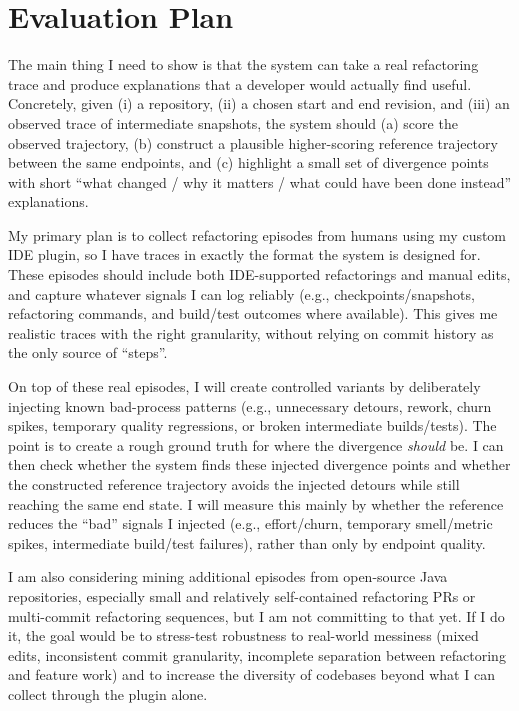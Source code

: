 \chapter{Evaluation Plan}
\label{ch:eval-plan}

The main thing I need to show is that the system can take a real refactoring trace and produce explanations that a developer would actually find useful. Concretely, given (i) a repository, (ii) a chosen start and end revision, and (iii) an observed trace of intermediate snapshots, the system should (a) score the observed trajectory, (b) construct a plausible higher-scoring reference trajectory between the same endpoints, and (c) highlight a small set of divergence points with short ``what changed / why it matters / what could have been done instead'' explanations.

My primary plan is to collect refactoring episodes from humans using my custom IDE plugin, so I have traces in exactly the format the system is designed for. These episodes should include both IDE-supported refactorings and manual edits, and capture whatever signals I can log reliably (e.g., checkpoints/snapshots, refactoring commands, and build/test outcomes where available). This gives me realistic traces with the right granularity, without relying on commit history as the only source of ``steps''.

On top of these real episodes, I will create controlled variants by deliberately injecting known bad-process patterns (e.g., unnecessary detours, rework, churn spikes, temporary quality regressions, or broken intermediate builds/tests). The point is to create a rough ground truth for where the divergence \emph{should} be. I can then check whether the system finds these injected divergence points and whether the constructed reference trajectory avoids the injected detours while still reaching the same end state. I will measure this mainly by whether the reference reduces the ``bad'' signals I injected (e.g., effort/churn, temporary smell/metric spikes, intermediate build/test failures), rather than only by endpoint quality.

I am also considering mining additional episodes from open-source Java repositories, especially small and relatively self-contained refactoring PRs or multi-commit refactoring sequences, but I am not committing to that yet. If I do it, the goal would be to stress-test robustness to real-world messiness (mixed edits, inconsistent commit granularity, incomplete separation between refactoring and feature work) and to increase the diversity of codebases beyond what I can collect through the plugin alone.

